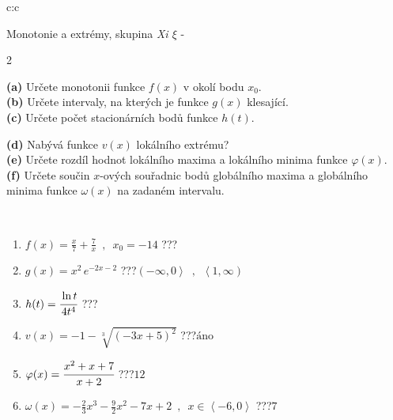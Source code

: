 \documentclass[10pt]{report}
\begin{document}
\newpage
\thispagestyle{empty}
\begin{tabular}{c:c}
\begin{minipage}[c][104.5mm][t]{0.5\linewidth}
\begin{center}
\vspace{7mm}
{\huge Monotonie a extrémy, skupina \textit{Xi $\xi$} -}\\[5mm]
\begin{minipage}{0.95\linewidth}
\begin{center}
{\small \begin{multicols}{2} \raggedright
\textbf{(a)} Určete monotonii funkce \(f(x)\) v okolí bodu \(x_0\). \\[1mm]
\textbf{(b)} Určete intervaly, na kterých je funkce \(g(x)\) klesající. \\[1mm]
\textbf{(c)} Určete počet stacionárních bodů funkce \(h(t)\). \par \columnbreak
\textbf{(d)} Nabývá funkce \(v(x)\) lokálního extrému? \\[1mm]
\textbf{(e)} Určete rozdíl hodnot lokálního maxima a lokálního minima funkce \(\varphi(x)\). \\[1mm]
\textbf{(f)} Určete součin \(x\)-ových souřadnic bodů globálního maxima a globálního minima funkce \(\omega(x)\) na zadaném intervalu. \\[1mm]
\end{multicols}
}
\end{center}
\end{minipage}
\\[4mm]
\begin{minipage}{0.79\linewidth}
\begin{center}
\begin{varwidth}{\linewidth}
\begin{enumerate}
\normalsize
\item $f(x)=\frac{x}{7}+\frac{7}{x} \enspace , \enspace x_0=-14$\quad \dotfill\; ???\;\dotfill \quad {}
\item $g(x)=x^2\, e^{-2x-2}$\quad \dotfill\; ???\;\dotfill \quad $\left(-\infty , 0\right\rangle\enspace , \enspace \left\langle1 , \infty\right)$
\item $h(t)=\cfrac{\ln t}{4t^4}$\quad \dotfill\; ???\;\dotfill {}
\item $v(x)=-1-\sqrt[3]{(-3x+5)^2}$\quad \dotfill\; ???\;\dotfill \quad $\text{áno}$
\item $\varphi(x)=\cfrac{x^2+x+7}{x+2}$\quad \dotfill\; ???\;\dotfill \quad $12$
\item $\omega(x)=-\frac{2}{3}x^3-\frac{9}{2}x^2-7x+2 \enspace , \enspace x\in\left\langle-6 , 0\right\rangle$\quad \dotfill\; ???\;\dotfill \quad $7$

\end{enumerate}
\end{varwidth}
\end{center}
\end{minipage}
\end{center}
\end{minipage}
\end{tabular}
\end{document}
